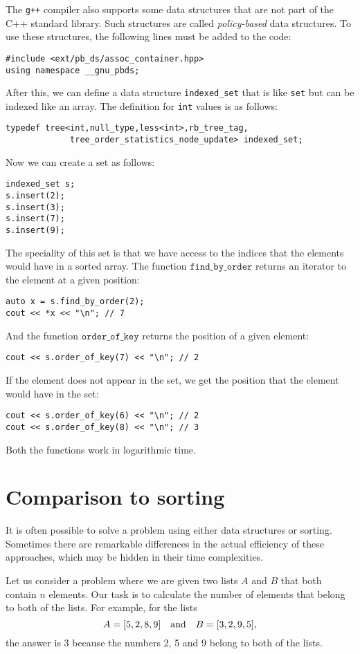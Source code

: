 The \texttt{g++} compiler also supports
some data structures that are not part
of the C++ standard library.
Such structures are called \emph{policy-based}
data structures.
To use these structures, the following lines
must be added to the code:
\begin{lstlisting}
#include <ext/pb_ds/assoc_container.hpp>
using namespace __gnu_pbds; 
\end{lstlisting}
After this, we can define a data structure \texttt{indexed\_set} that
is like \texttt{set} but can be indexed like an array.
The definition for \texttt{int} values is as follows:
\begin{lstlisting}
typedef tree<int,null_type,less<int>,rb_tree_tag,
             tree_order_statistics_node_update> indexed_set; 
\end{lstlisting}
Now we can create a set as follows:
\begin{lstlisting}
indexed_set s;
s.insert(2);
s.insert(3);
s.insert(7);
s.insert(9);
\end{lstlisting}
The speciality of this set is that we have access to
the indices that the elements would have in a sorted array.
The function $\texttt{find\_by\_order}$ returns
an iterator to the element at a given position:
\begin{lstlisting}
auto x = s.find_by_order(2);
cout << *x << "\n"; // 7
\end{lstlisting}
And the function $\texttt{order\_of\_key}$
returns the position of a given element:
\begin{lstlisting}
cout << s.order_of_key(7) << "\n"; // 2
\end{lstlisting}
If the element does not appear in the set,
we get the position that the element would have
in the set:
\begin{lstlisting}
cout << s.order_of_key(6) << "\n"; // 2
cout << s.order_of_key(8) << "\n"; // 3
\end{lstlisting}
Both the functions work in logarithmic time.

\section{Comparison to sorting}

It is often possible to solve a problem
using either data structures or sorting.
Sometimes there are remarkable differences
in the actual efficiency of these approaches,
which may be hidden in their time complexities.

Let us consider a problem where
we are given two lists $A$ and $B$
that both contain $n$ elements.
Our task is to calculate the number of elements
that belong to both of the lists.
For example, for the lists
\[A = [5,2,8,9] \hspace{10px} \textrm{and} \hspace{10px} B = [3,2,9,5],\]
the answer is 3 because the numbers 2, 5
and 9 belong to both of the lists.

